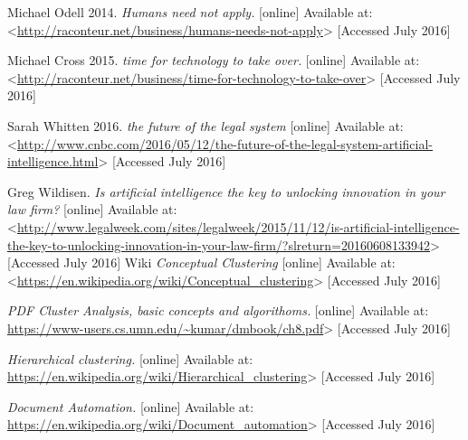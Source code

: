 \documentclass[12pt]{article}
\begin{document}
Michael Odell 2014. \textit{Humans need not apply.} [online] Available at: <\url{http://raconteur.net/business/humans-needs-not-apply}> [Accessed July 2016]
\newline
\newline

Michael Cross 2015. \textit{time for technology to take over.} [online] Available at: <\url{http://raconteur.net/business/time-for-technology-to-take-over}> [Accessed July 2016]
\newline
\newline


Sarah Whitten 2016. \textit{the future of the legal system} [online] Available at: <\url{http://www.cnbc.com/2016/05/12/the-future-of-the-legal-system-artificial-intelligence.html}> [Accessed July 2016]
\newline
\newline

Greg Wildisen. \textit{Is artificial intelligence the key to unlocking innovation in your law firm?} [online] Available at: <\url{http://www.legalweek.com/sites/legalweek/2015/11/12/is-artificial-intelligence-the-key-to-unlocking-innovation-in-your-law-firm/?slreturn=20160608133942}> [Accessed July 2016]
\newline
\newline
Wiki \textit{Conceptual Clustering} [online] Available at: <\url{https://en.wikipedia.org/wiki/Conceptual_clustering}> [Accessed July 2016]
\newline
\newline

 \textit{PDF Cluster Analysis, basic concepts and algorithoms.} [online] Available at: \url{https://www-users.cs.umn.edu/~kumar/dmbook/ch8.pdf}> [Accessed July 2016]
\newline
\newline

 \textit{Hierarchical clustering.} [online] Available at: \url{https://en.wikipedia.org/wiki/Hierarchical_clustering}> [Accessed July 2016]
\newline
\newline


 \textit{Document Automation.} [online] Available at: \url{https://en.wikipedia.org/wiki/Document_automation}> [Accessed July 2016]
\newline
\newline
\end{document}
